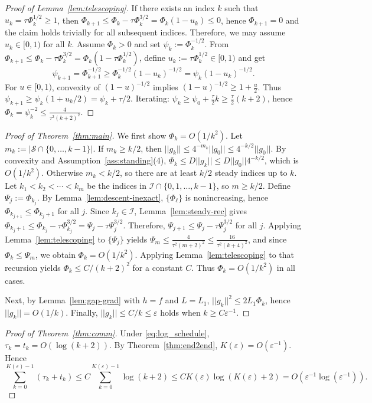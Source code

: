 \documentclass[11pt,a4paper]{article}
\def\cO{O}%
\def\norm#1{||#1||}%
\newcommand{\norm}[1]{\left\|#1\right\|}
\newcommand{\cO}{\mathcal{O}}
\begin{document}
	\begin{proof}[Proof of Lemma~\ref{lem:telescoping}]
		If there exists an index $k$ such that $u_k=\tau\Phi_k^{1/2}\ge 1$, then
		$\Phi_{k+1}\le \Phi_k-\tau\Phi_k^{3/2}=\Phi_k(1-u_k)\le 0$, hence $\Phi_{k+1}=0$
		and the claim holds trivially for all subsequent indices. Therefore, we may
		assume $u_k\in[0,1)$ for all $k$.
		Assume $\Phi_k>0$ and set $\psi_k:=\Phi_k^{-1/2}$.
		From $\Phi_{k+1}\le \Phi_k-\tau\Phi_k^{3/2}=\Phi_k(1-\tau\Phi_k^{1/2})$, define $u_k:=\tau\Phi_k^{1/2}\in[0,1)$ and get
		\[
		\psi_{k+1}=\Phi_{k+1}^{-1/2}\ge \Phi_k^{-1/2}(1-u_k)^{-1/2}=\psi_k(1-u_k)^{-1/2}.
		\]
		For $u\in[0,1)$, convexity of $(1-u)^{-1/2}$ implies $(1-u)^{-1/2}\ge 1+\frac{u}{2}$.
		Thus $\psi_{k+1}\ge \psi_k(1+u_k/2)=\psi_k+\tau/2$.
		Iterating: $\psi_k\ge \psi_0+\frac{\tau}{2}k\ge \frac{\tau}{2}(k+2)$, hence
		$\Phi_k=\psi_k^{-2}\le \frac{4}{\tau^2(k+2)^2}$.
	\end{proof}
	
	\begin{proof}[Proof of Theorem~\ref{thm:main}]
		We first show $\Phi_k=\cO(1/k^2)$.
		Let $m_k:=|\mathcal S\cap\{0,\dots,k-1\}|$.
		If $m_k\ge k/2$, then $\norm{g_k}\le 4^{-m_k}\norm{g_0}\le 4^{-k/2}\norm{g_0}$.
		By convexity and Assumption~\ref{ass:standing}(4), $\Phi_k\le D\norm{g_k}\le D\norm{g_0}4^{-k/2}$, which is $\cO(1/k^2)$.
		Otherwise $m_k<k/2$, so there are at least $k/2$ steady indices up to $k$.
Let $k_1<k_2<\cdots<k_m$ be the indices in $\mathcal I\cap\{0,1,\dots,k-1\}$,
so $m\ge k/2$. Define $\Psi_j:=\Phi_{k_j}$.
By Lemma~\ref{lem:descent-inexact}, $\{\Phi_\ell\}$ is nonincreasing, hence
$\Phi_{k_{j+1}}\le \Phi_{k_j+1}$ for all $j$.
Since $k_j\in\mathcal I$, Lemma~\ref{lem:steady-rec} gives
$\Phi_{k_j+1}\le \Phi_{k_j}-\tau\Phi_{k_j}^{3/2}=\Psi_j-\tau\Psi_j^{3/2}$.
Therefore, $\Psi_{j+1}\le \Psi_j-\tau\Psi_j^{3/2}$ for all $j$.
Applying Lemma~\ref{lem:telescoping} to $\{\Psi_j\}$ yields
$\Psi_m\le \frac{4}{\tau^2(m+2)^2}\le \frac{16}{\tau^2(k+4)^2}$,
and since $\Phi_k\le \Psi_m$, we obtain $\Phi_k=\cO(1/k^2)$.
		Applying Lemma~\ref{lem:telescoping} to that recursion yields $\Phi_k\le C/(k+2)^2$ for a constant $C$.
		Thus $\Phi_k=\cO(1/k^2)$ in all cases.
		
		Next, by Lemma~\ref{lem:gap-grad} with $h=f$ and $L=L_1$,
		$\norm{g_k}^2\le 2L_1\Phi_k$, hence $\norm{g_k}=\cO(1/k)$.
		Finally, $\norm{g_k}\le C/k\le \varepsilon$ holds when $k\ge C\varepsilon^{-1}$.
	\end{proof}
	
	\begin{proof}[Proof of Theorem~\ref{thm:comm}]
		Under \eqref{eq:log_schedule}, $\tau_k=t_k=\cO(\log(k+2))$. By Theorem~\ref{thm:end2end}, $K(\varepsilon)=\cO(\varepsilon^{-1})$. Hence
		\[
		\sum_{k=0}^{K(\varepsilon)-1}(\tau_k+t_k)\le C \sum_{k=0}^{K(\varepsilon)-1}\log(k+2)
		\le C K(\varepsilon)\log(K(\varepsilon)+2)=\cO(\varepsilon^{-1}\log(\varepsilon^{-1})).
		\]
	\end{proof}
	
\end{document}
